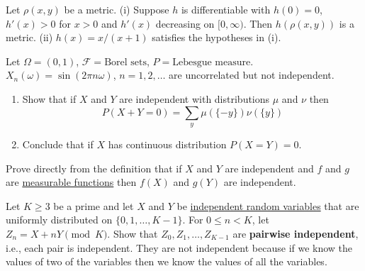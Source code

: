   \begin{exercise}[Durrett 2.1.3]
    Let $\rho(x, y)$ be a metric. (i) Suppose $h$ is differentiable with $h(0) = 0$, $h'(x) > 0$ for $x > 0$ and $h'(x)$ decreasing on $[0, \infty)$. Then $h(\rho(x, y))$ is a metric. (ii) $h(x) = x/(x + 1)$ satisfies the hypotheses in (i).
  \end{exercise}
  \begin{solution}

  \end{solution}

  \begin{exercise}[Durrett 2.1.4]
    Let $\Omega = (0, 1)$, $\mathcal{F} = \text{Borel sets}$, $P = \text{Lebesgue measure}$. $X_n(\omega) = \sin(2\pi n\omega)$, $n = 1, 2, \dots$ are uncorrelated but not independent.
  \end{exercise}
  \begin{solution}

  \end{solution}

  \begin{exercise}[Durrett 2.1.5]
    \begin{enumerate}
      \item Show that if $X$ and $Y$ are independent with distributions $\mu$ and $\nu$ then
      \begin{equation*}
        P(X + Y = 0) = \sum_y \mu(\{-y\})\nu(\{y\})
      \end{equation*}
      \item Conclude that if $X$ has continuous distribution $P(X = Y) = 0$.
    \end{enumerate}
  \end{exercise}
  \begin{solution}

  \end{solution}

  \begin{exercise}[Durrett 2.1.6]
    Prove directly from the definition that if $X$ and $Y$ are independent and $f$ and $g$ are \hyperref[mt-def:measurable-function]{measurable functions} then $f(X)$ and $g(Y)$ are independent.
  \end{exercise}
  \begin{solution}

  \end{solution}

  \begin{exercise}[Durrett 2.1.7]
    Let $K \geq 3$ be a prime and let $X$ and $Y$ be \hyperref[def:independent-random-variables]{independent random variables} that are uniformly distributed on $\{0, 1, \dots, K-1\}$. For $0 \leq n < K$, let $Z_n = X + nY \pmod K$. Show that $Z_0, Z_1, \dots, Z_{K-1}$ are \textbf{pairwise independent}, i.e., each pair is independent. They are not independent because if we know the values of two of the variables then we know the values of all the variables.
  \end{exercise}
  \begin{solution}

  \end{solution}

